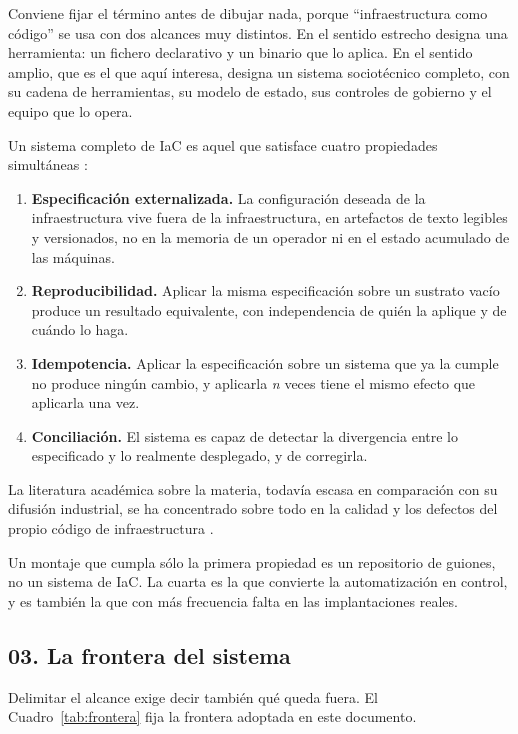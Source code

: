\documentclass[11pt,letterpaper]{article}
\begin{document}
Conviene fijar el término antes de dibujar nada, porque \enquote{infraestructura
como código} se usa con dos alcances muy distintos. En el sentido estrecho
designa una herramienta: un fichero declarativo y un binario que lo aplica. En
el sentido amplio, que es el que aquí interesa, designa un sistema
sociotécnico completo, con su cadena de herramientas, su modelo de estado, sus
controles de gobierno y el equipo que lo opera.

Un sistema completo de IaC es aquel que satisface cuatro propiedades
simultáneas \parencite{morris2021}:

\begin{enumerate}
  \item \textbf{Especificación externalizada.} La configuración deseada de la
    infraestructura vive fuera de la infraestructura, en artefactos de texto
    legibles y versionados, no en la memoria de un operador ni en el estado
    acumulado de las máquinas.
  \item \textbf{Reproducibilidad.} Aplicar la misma especificación sobre un
    sustrato vacío produce un resultado equivalente, con independencia de
    quién la aplique y de cuándo lo haga.
  \item \textbf{Idempotencia.} Aplicar la especificación sobre un sistema que
    ya la cumple no produce ningún cambio, y aplicarla \emph{n} veces tiene el
    mismo efecto que aplicarla una vez.
  \item \textbf{Conciliación.} El sistema es capaz de detectar la divergencia
    entre lo especificado y lo realmente desplegado, y de corregirla.
\end{enumerate}

La literatura académica sobre la materia, todavía escasa en comparación con su
difusión industrial, se ha concentrado sobre todo en la calidad y los defectos
del propio código de infraestructura \parencite{rahman2019}.

Un montaje que cumpla sólo la primera propiedad es un repositorio de guiones,
no un sistema de IaC. La cuarta es la que convierte la automatización en
control, y es también la que con más frecuencia falta en las implantaciones
reales.

\subsection*{03. La frontera del sistema}

Delimitar el alcance exige decir también qué queda fuera. El
Cuadro~\ref{tab:frontera} fija la frontera adoptada en este documento.
\end{document}

